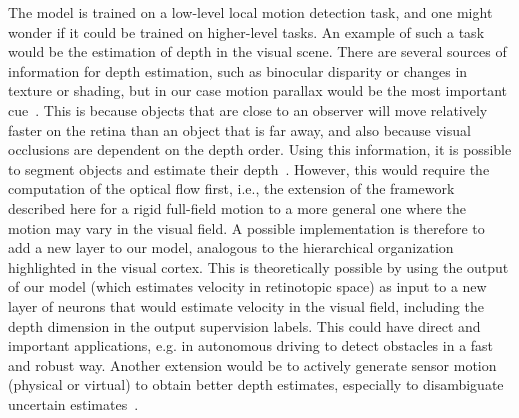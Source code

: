 \documentclass[default]{sn-jnl}%
\theoremstyle{thmstyleone}%
\theoremstyle{thmstyletwo}%
\theoremstyle{thmstylethree}%
\begin{document}
The model is trained on a low-level local motion detection task, and one might wonder if it could be trained on higher-level tasks. An example of such a task would be the estimation of depth in the visual scene. There are several sources of information for depth estimation, such as binocular disparity or changes in texture or shading, but in our case motion parallax would be the most important cue~\citep{rogers_motion_1979}. This is because objects that are close to an observer will move relatively faster on the retina than an object that is far away, and also because visual occlusions are dependent on the depth order. Using this information, it is possible to segment objects and estimate their depth~\citep{yoonessi_contribution_2011}. However, this would require the computation of the optical flow first, i.e., the extension of the framework described here for a rigid full-field motion to a more general one where the motion may vary in the visual field. A possible implementation is therefore to add a new layer to our model, analogous to the hierarchical organization highlighted in the visual cortex. This is theoretically possible by using the output of our model (which estimates velocity in retinotopic space) as input to a new layer of neurons that would estimate velocity in the visual field, including the depth dimension in the output supervision labels. This could have direct and important applications, e.g. in autonomous driving to detect obstacles in a fast and robust way. Another extension would be to actively generate sensor motion (physical or virtual) to obtain better depth estimates, especially to disambiguate uncertain estimates~\citep{nawrot_eye_2003}.
\end{document}
